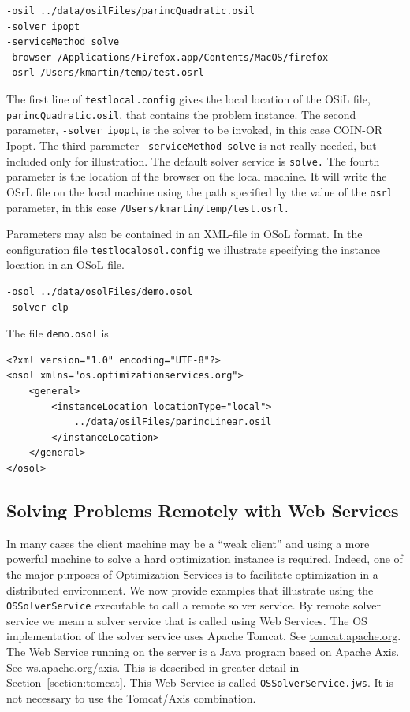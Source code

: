 \documentclass[11pt]{article}
\renewcommand{\_}{{\char"5F}}
\renewcommand{\{}{{\char"7B}}
\renewcommand{\}}{{\char"7D}}
\renewcommand{\^}{{\char"0D}}
\renewcommand{\'}{{\char"0D}}
\begin{document}
\begin{enumerate}[Step 1:]
\begin{verbatim}
-osil ../data/osilFiles/parincQuadratic.osil
-solver ipopt
-serviceMethod solve
-browser /Applications/Firefox.app/Contents/MacOS/firefox
-osrl /Users/kmartin/temp/test.osrl
\end{verbatim}



The first line of {\tt testlocal.config} gives the local location
of the OSiL file,
{\tt parincQuadratic.osil}, that contains the problem instance. The second parameter,
{\tt -solver ipopt},  is the solver to be invoked, in this case COIN-OR Ipopt.
The third parameter {\tt -serviceMethod solve} is not really needed,
but included only for illustration. The default solver service is {\tt solve.}
The fourth parameter is the location of the browser on the local machine.
It will write the OSrL file on the local machine using the path specified
by the value of the {\tt osrl} parameter, in this case
{\tt /Users/kmartin/temp/test.osrl.}

Parameters may also be contained in an XML-file in OSoL format. In the configuration file
{\tt testlocalosol.config} we illustrate specifying the instance location in an OSoL file.
\begin{verbatim}
-osol ../data/osolFiles/demo.osol
-solver clp
\end{verbatim}
The file {\tt demo.osol} is

\begin{verbatim}
<?xml version="1.0" encoding="UTF-8"?>
<osol xmlns="os.optimizationservices.org">
    <general>
        <instanceLocation locationType="local">
            ../data/osilFiles/parincLinear.osil
        </instanceLocation>
    </general>
</osol>
\end{verbatim}


\subsection{Solving Problems Remotely with Web Services}\label{section:servicemethods}

In many cases the client machine may be a ``weak client'' and  using a more powerful machine to solve a
hard optimization instance is required. Indeed, one of the major purposes of Optimization Services is to
facilitate optimization in a distributed environment.   We now provide examples that illustrate using the
{\tt OSSolverService} executable to call a remote solver service.   By remote solver service we mean a
solver service that is called using Web Services.  The OS implementation  of the solver service
uses Apache Tomcat. See \url{tomcat.apache.org}. The Web Service running on the server
is a Java program based on Apache Axis. See \url{ws.apache.org/axis}. This is described
in greater detail in Section~\ref{section:tomcat}.
This Web Service is called {\tt OSSolverService.jws}.
It is not necessary to use the Tomcat/Axis combination.




\end{enumerate}
\end{document}
